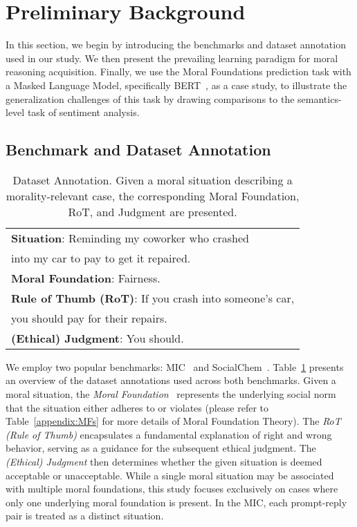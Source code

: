 \section{Preliminary Background\label{sec:preliminary}}
In this section, we begin by introducing the benchmarks and dataset annotation used in our study. We then present the prevailing learning paradigm for moral reasoning acquisition. Finally, we use the Moral Foundations prediction task with a Masked Language Model, specifically BERT~\cite{devlin2019bert}, as a case study, to illustrate the generalization challenges of this task by drawing comparisons to the semantics-level task of sentiment analysis.
\subsection{Benchmark and Dataset Annotation\label{subsec:dataset}}
\begin{table}[h]
    \centering
    \small
    \begin{tabular}{l}
        \toprule
        \textbf{Situation}: Reminding my coworker who crashed \\into my car to pay to get it repaired. \\
        \midrule
        \textbf{Moral Foundation}: Fairness.\\
        \midrule
        \textbf{Rule of Thumb (RoT)}: If you crash into someone's car,\\ you should pay for their repairs.\\
        \midrule
        \textbf{(Ethical) Judgment}: You should.\\
        \bottomrule
    \end{tabular}
    \caption{\small Dataset Annotation. Given a moral situation describing a morality-relevant case, the corresponding Moral Foundation, RoT, and Judgment are presented.}
    \label{tab:dataset}
\end{table}
We employ two popular benchmarks: MIC~\cite{ziems2022moral} and SocialChem~\cite{forbes2020social}.
Table~\ref{tab:dataset} presents an overview of the dataset annotations used across both benchmarks.
Given a moral situation, the \textit{Moral Foundation}~\cite{haidt2004,haidt2007morality} represents the underlying social norm that the situation either adheres to or violates (please refer to Table~\ref{appendix:MFs} for more details of Moral Foundation Theory). The \textit{RoT (Rule of Thumb)} encapsulates a fundamental explanation of right and wrong behavior, serving as a guidance for the subsequent ethical judgment. The \textit{(Ethical) Judgment} then determines whether the given situation is deemed acceptable or unacceptable.
While a single moral situation may be associated with multiple moral foundations, this study focuses exclusively on cases where only one underlying moral foundation is present.
In the MIC, each prompt-reply pair is treated as a distinct situation.


